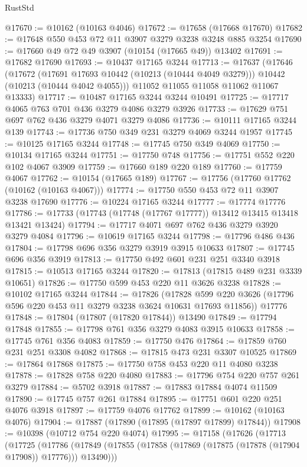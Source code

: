 \begin{lexlean}{RustStd}
\begin{coremodule}
{\begin{coremodule}
{{{{{{{{{{{{{{{{{{{{{{{{{{@17670 := @10162 (@10163 @4046)
@17672 := @17658 (@17668 @17670)
@17682 := @17648 @550 @453 @72 @11 @3907 @3279 @3238 @3248 @885 @3254
@17690 := @17660 @49 @72 @49 @3907 (@10154 (@17665 @49)) @13402
@17691 := @17682 @17690
@17693 := @10437 @17165 @3244
@17713 := @17637
    (@17646
      (@17672
        (@17691 @17693 @10442 (@10213 (@10444 @4049 @3279)))
        @10442
        (@10213 (@10444 @4042 @4055)))
      @11052
      @11055
      @11058
      @11062
      @11067
      @13333)
@17717 := @10487 @17165 @3244 @3244 @10491
@17725 := @17717 @4065 @763 @701 @436 @3279 @4086 @3279 @3926
@17733 := @17629 @751 @697 @762 @436 @3279 @4071 @3279 @4086
@17736 := @10111 @17165 @3244 @139
@17743 := @17736 @750 @349 @231 @3279 @4069 @3244 @1957
@17745 := @10125 @17165 @3244
@17748 := @17745 @750 @349 @4069
@17750 := @10134 @17165 @3244
@17751 := @17750 @748
@17756 := @17751 @552 @220 @102 @4067 @3909
@17759 := @17660 @189 @220 @189
@17760 := @17759 @4067
@17762 := @10154 (@17665 @189)
@17767 := @17756 (@17760 @17762 (@10162 (@10163 @4067)))
@17774 := @17750 @550 @453 @72 @11 @3907 @3238 @17690
@17776 := @10224 @17165 @3244
@17777 := @17774 @17776
@17786 := @17733 (@17743 (@17748 (@17767 @17777)) @13412 @13415 @13418 @13421 @13424)
@17794 := @17717 @4071 @697 @762 @436 @3279 @3920 @3279 @4084
@17796 := @10619 @17165 @3244
@17798 := @17796 @486 @436
@17804 := @17798 @696 @356 @3279 @3919 @3915 @10633
@17807 := @17745 @696 @356 @3919
@17813 := @17750 @492 @601 @231 @251 @3340 @3918
@17815 := @10513 @17165 @3244
@17820 := @17813 (@17815 @489 @231 @3339 @10651)
@17826 := @17750 @599 @453 @220 @11 @3626 @3238
@17828 := @10102 @17165 @3244
@17844 := @17826
    (@17828 @599 @220 @3626 (@17796 @596 @220 @453 @11 @3279 @3238 @3624 @10631 @17693 @11856))
    @17776
@17848 := @17804 (@17807 (@17820 @17844)) @13490
@17849 := @17794 @17848
@17855 := @17798 @761 @356 @3279 @4083 @3915 @10633
@17858 := @17745 @761 @356 @4083
@17859 := @17750 @476
@17864 := @17859 @760 @231 @251 @3308 @4082
@17868 := @17815 @473 @231 @3307 @10525
@17869 := @17864 @17868
@17875 := @17750 @758 @453 @220 @11 @4080 @3238
@17878 := @17828 @758 @220 @4080
@17883 := @17796 @754 @220 @757 @261 @3279
@17884 := @5702 @3918
@17887 := @17883 @17884 @4074 @11509
@17890 := @17745 @757 @261 @17884
@17895 := @17751 @601 @220 @251 @4076 @3918
@17897 := @17759 @4076 @17762
@17899 := @10162 (@10163 @4076)
@17904 := @17887 (@17890 (@17895 (@17897 @17899) @17844))
@17908 := @10398 (@10712 @754 @220 @4074)
@17995 := @17158
    (@17626
      (@17713
        (@17725
          (@17786
            (@17849 (@17855 (@17858 (@17869 (@17875 (@17878 (@17904 @17908)) @17776))) @13490)))
}}}}}}}}}}}}}}}}}}}}}}}}}}
\end{coremodule}}
\end{coremodule}
\end{lexlean}
